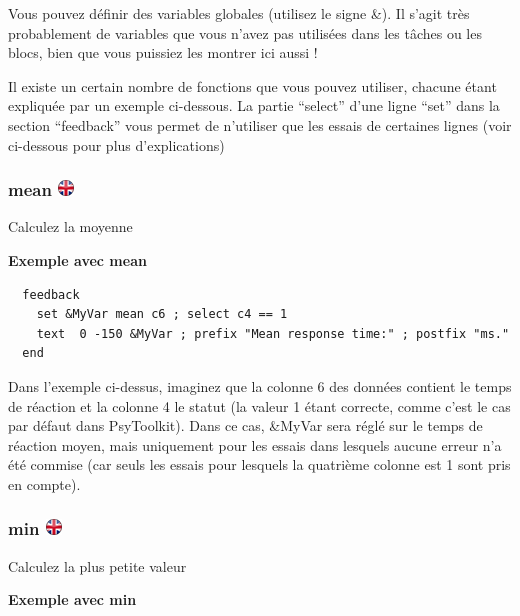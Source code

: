 \documentclass[
]{book}
\begin{document}
Vous pouvez définir des variables globales (utilisez le signe \&). Il s'agit très probablement de variables que vous n'avez pas utilisées dans les tâches ou les blocs, bien que vous puissiez les montrer ici aussi !

Il existe un certain nombre de fonctions que vous pouvez utiliser, chacune étant expliquée par un exemple ci-dessous. La partie ``select'' d'une ligne ``set'' dans la section ``feedback'' vous permet de n'utiliser que les essais de certaines lignes (voir ci-dessous pour plus d'explications)

\hypertarget{mean}{%
\subsubsection[mean ]{\texorpdfstring{mean \href{https://www.psytoolkit.org/doc3.1.0/feedback.html\#_mean}{\protect\includegraphics{img/ukflag.png}}}{mean }}\label{mean}}

Calculez la moyenne

\textbf{Exemple avec mean}

\begin{verbatim}
  feedback
    set &MyVar mean c6 ; select c4 == 1
    text  0 -150 &MyVar ; prefix "Mean response time:" ; postfix "ms."
  end
\end{verbatim}

Dans l'exemple ci-dessus, imaginez que la colonne 6 des données contient le temps de réaction et la colonne 4 le statut (la valeur 1 étant correcte, comme c'est le cas par défaut dans PsyToolkit). Dans ce cas, \&MyVar sera réglé sur le temps de réaction moyen, mais uniquement pour les essais dans lesquels aucune erreur n'a été commise (car seuls les essais pour lesquels la quatrième colonne est 1 sont pris en compte).

\hypertarget{min}{%
\subsubsection[min ]{\texorpdfstring{min \href{https://www.psytoolkit.org/doc3.1.0/feedback.html\#_min}{\protect\includegraphics{img/ukflag.png}}}{min }}\label{min}}

Calculez la plus petite valeur

\textbf{Exemple avec min }
\end{document}
